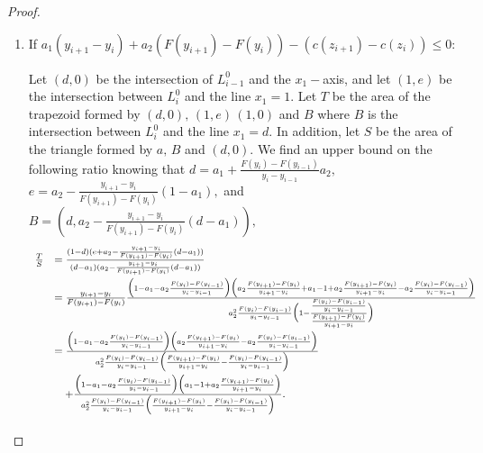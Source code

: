 \documentclass[12pt,reqno]{amsart}
\begin{document}
\begin{proof}
\begin{enumerate}
\begin{enumerate}
          A similar argument to the one in the proof of Lemma \ref{case1} implies that $\frac{d}{d\epsilon}\Big|_{\epsilon=0} \mathcal P(v^\epsilon)>0.$


        \item  If $a_1(y_{i+1}-y_i)+a_2(F(y_{i+1})-F(y_i)) -(c(z_{i+1})-c(z_i))\le0:$

Let $(d,0)$ be the intersection of $L_{i-1}^0$ and the $x_1-$axis, and let $(1,e)$ be the intersection between $L_{i}^0$ and the line $x_1=1.$ Let $T$ be the area of the trapezoid formed by $(d,0),\,(1,e)\, (1,0)$ and $B$ where $B$ is the intersection between $L_{i}^0$ and the line $x_1=d.$ In addition, let $S$ be the area of the triangle formed by $a,\,B$ and $(d,0).$  We find an upper bound on the following ratio knowing that $d=a_1+\frac{F(y_i)-F(y_{i-1})}{y_i-y_{i-1}}a_2,$  $e=a_2-\frac{y_{i+1}-y_i}{F(y_{i+1})-F(y_i)}(1-a_1),$ and $B=(d,a_2-\frac{y_{i+1}-y_i}{F(y_{i+1})-F(y_i)}(d-a_1)),$
          \[\begin{array}{ll}
 
        \frac{T}{S}
        &=  \frac{(1-d)(e+a_2-\frac{y_{i+1}-y_i}{F(y_{i+1})-F(y_i)}(d-a_1))}{(d-a_1)(a_2-\frac{y_{i+1}-y_i}{F(y_{i+1})-F(y_i)}(d-a_1))}\vspace{3pt}\\
&=\frac{y_{i+1}-y_i}{F(y_{i+1})-F(y_i)}\frac{\Big(1-a_1-a_2\frac{F(y_i)-F(y_{i-1})}{y_i-y_{i-1}}\Big)\Big(a_2\frac{F(y_{i+1})-F(y_i)}{y_{i+1}-y_i}+a_1-1+a_2\frac{F(y_{i+1})-F(y_i)}{y_{i+1}-y_i}-a_2\frac{F(y_i)-F(y_{i-1})}{y_i-y_{i-1}}\Big)}{a_2^2\frac{F(y_i)-F(y_{i-1})}{y_i-y_{i-1}}\Big(1-\frac{\frac{F(y_i)-F(y_{i-1})}{y_i-y_{i-1}}}{\frac{F(y_{i+1})-F(y_i)}{y_{i+1}-y_i}}\Big)}\vspace{3pt}\\
&=\frac{\Big(1-a_1-a_2\frac{F(y_i)-F(y_{i-1})}{y_i-y_{i-1}}\Big)\Big(a_2\frac{F(y_{i+1})-F(y_{i})}{y_{i+1}-y_{i}}-a_2\frac{F(y_i)-F(y_{i-1})}{y_i-y_{i-1}}\Big)}{a_2^2\frac{F(y_i)-F(y_{i-1})}{y_i-y_{i-1}}\Big(\frac{F(y_{i+1})-F(y_{i})}{y_{i+1}-y_{i}}-\frac{F(y_i)-F(y_{i-1})}{y_i-y_{i-1}}\Big)}\vspace{3pt}\\
&\quad+\frac{\Big(1-a_1-a_2\frac{F(y_i)-F(y_{i-1})}{y_i-y_{i-1}}\Big)\Big(a_1-1+a_2\frac{F(y_{i+1})-F(y_{i})}{y_{i+1}-y_{i}}\Big)}{a_2^2\frac{F(y_i)-F(y_{i-1})}{y_i-y_{i-1}}\Big(\frac{F(y_{i+1})-F(y_{i})}{y_{i+1}-y_{i}}-\frac{F(y_i)-F(y_{i-1})}{y_i-y_{i-1}}\Big)}.\vspace{3pt}\\
          \end{array}\]


\end{enumerate}
\end{enumerate}
\end{proof}
\end{document}
